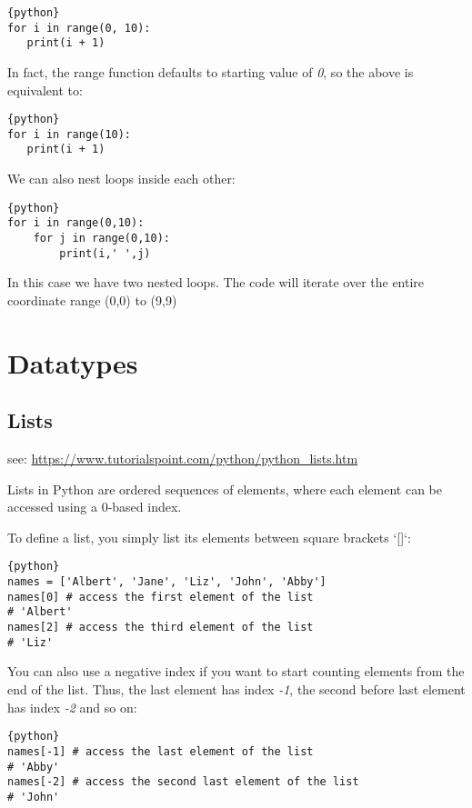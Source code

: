 \begin{lstlisting}{python}
for i in range(0, 10):
   print(i + 1)
\end{lstlisting}

In fact, the range function defaults to starting value of \emph{0}, so
the above is equivalent to:

\begin{lstlisting}{python}
for i in range(10):
   print(i + 1)
\end{lstlisting}

We can also nest loops inside each other:

\begin{lstlisting}{python}
for i in range(0,10):
    for j in range(0,10):
        print(i,' ',j)
\end{lstlisting}

In this case we have two nested loops. The code will iterate over the
entire coordinate range (0,0) to (9,9)

\section{Datatypes}\label{datatypes}

\subsection{Lists}\label{lists}

see: \url{https://www.tutorialspoint.com/python/python_lists.htm}

Lists in Python are ordered sequences of elements, where each element
can be accessed using a 0-based index.

To define a list, you simply list its elements between square brackets
`{[}{]}`:

\begin{lstlisting}{python}
names = ['Albert', 'Jane', 'Liz', 'John', 'Abby']
names[0] # access the first element of the list
# 'Albert'
names[2] # access the third element of the list
# 'Liz'
\end{lstlisting}

You can also use a negative index if you want to start counting elements
from the end of the list. Thus, the last element has index \emph{-1},
the second before last element has index \emph{-2} and so on:

\begin{lstlisting}{python}
names[-1] # access the last element of the list
# 'Abby'
names[-2] # access the second last element of the list
# 'John'
\end{lstlisting}

